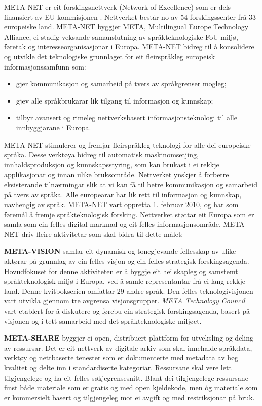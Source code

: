 \begin{multicols}{2}

META-NET er eit forskingsnettverk (Network of Excellence) som er dels finansiert av EU-kommisjonen \cite{rehm2011}. Nettverket består no av 54 forskingssenter frå 33 europeiske land. META-NET byggjer META, Multilingual Europe Technology Alliance, ei stadig veksande samanslutning av språkteknologiske FoU-miljø, føretak og interesseorganisasjonar i Europa.
META-NET bidreg til å konsolidere og utvikle det teknologiske grunnlaget for eit fleirspråkleg europeisk informasjonssamfunn som:

\begin{itemize}
\item gjer kommunikasjon og samarbeid på tvers av språkgrenser mogleg;
\item gjev alle språkbrukarar lik tilgang til informasjon og kunnskap;
\item tilbyr avansert og rimeleg nettverksbasert informasjonsteknologi til alle innbyggjarane i Europa.
\end{itemize}

META-NET stimulerer og fremjar fleirspråkleg teknologi for alle dei europeiske språka. Desse verktøya bidreg til automatisk maskinomsetjing, innhaldsproduksjon og kunnskapsstyring, som kan brukast i ei rekkje applikasjonar og innan ulike bruksområde. Nettverket ynskjer å forbetre eksisterande tilnærmingar slik at vi kan få til betre kommunikasjon og samarbeid på tvers av språka. Alle europearar har lik rett til informasjon og kunnskap, uavhengig av språk.
META-NET vart oppretta 1. februar 2010, og har som føremål å fremje
språkteknologisk forsking. Nettverket støttar eit Europa som er samla
som ein felles digital marknad og eit felles
informasjonsområde. META-NET driv fleire aktivitetar som skal bidra
til dette målet:
\columnbreak

\textbf{META-VISION} samlar eit dynamisk og tonegjevande fellesskap av ulike aktørar på grunnlag av ein felles visjon og ein felles strategisk forskingsagenda. Hovudfokuset for denne aktiviteten er å byggje eit heilskapleg og samstemt språkteknologisk miljø i Europa, ved å samle representantar frå ei lang rekkje land. Denne kvitbokserien omfattar 29 andre språk. Den felles teknologivisjonen vart utvikla gjennom tre avgrensa visjonsgrupper. \textit{META Technology Council} vart etablert for å diskutere og førebu ein strategisk forskingsagenda, basert på visjonen og i tett samarbeid med det språkteknologiske miljøet.

\textbf{META-SHARE} byggjer ei open, distribuert plattform for utveksling og deling av ressursar. Det er eit nettverk av digitale arkiv som skal innehalde språkdata, verktøy og nettbaserte tenester som er dokumenterte med metadata av høg kvalitet og delte inn i standardiserte kategoriar. Ressursane skal vere lett tilgjengelege og ha eit felles søkjegrensesnitt. Blant dei tilgjengelege ressursane finst både materiale som er gratis og med open kjeldekode, men òg materiale som er kommersielt basert og tilgjengeleg mot ei avgift og med restriksjonar på bruk. 


\end{multicols}
